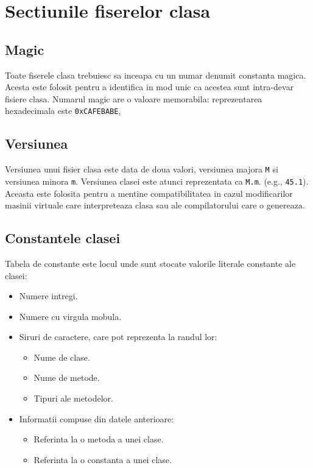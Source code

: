 \section{Sectiunile fiserelor clasa}

\subsection{Magic}

Toate fiserele clasa trebuiesc sa inceapa cu un numar denumit constanta
magica. Acesta este folosit pentru a identifica in mod unic ca acestea
sunt intra-devar fisiere clasa. Numarul magic are o valoare memorabila:
reprezentarea hexadecimala este \texttt{0xCAFEBABE},

\subsection{Versiunea}

Versiunea unui fisier clasa este data de doua valori, versiunea majora
\texttt{M} si versiunea minora \texttt{m}. Versiunea clasei este atunci
reprezentata ca \texttt{M.m}. (e.g., \texttt{45.1}). Aceasta este
folosita pentru a mentine compatibilitatea in cazul modificarilor
masinii virtuale care interpreteaza clasa sau ale compilatorului care o
genereaza.

\subsection{Constantele clasei}

Tabela de constante este locul unde sunt stocate valorile literale
constante ale clasei:

\begin{itemize}
    \item Numere intregi.
    \item Numere cu virgula mobula.
    \item Siruri de caractere, care pot reprezenta la randul lor:
        \begin{itemize}
            \item Nume de clase.
            \item Nume de metode.
            \item Tipuri ale metodelor.
        \end{itemize}
    \item Informatii compuse din datele anterioare:
        \begin{itemize}
            \item Referinta la o metoda a unei clase.
            \item Referinta la o constanta a unei clase.
        \end{itemize}
\end{itemize}

